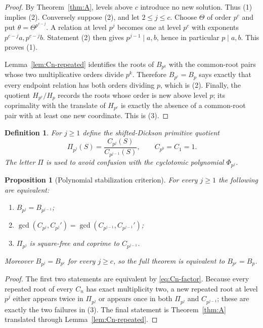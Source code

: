 \documentclass[a4paper]{article}
\newtheorem{proposition}[theorem]{Proposition}
\newtheorem{definition}[theorem]{Definition}
\begin{document}
\begin{proof}
	By Theorem~\ref{thm:A}, levels above $c$ introduce no new solution.
	Thus (1) implies (2).  Conversely suppose (2), and let
	$2\leq j\leq c$.  Choose $\Theta$ of order $p^c$ and put
	$\theta=\Theta^{p^{c-j}}$.  A relation at level $p^j$ becomes one at
	level $p^c$ with exponents $p^{c-j}a,p^{c-j}b$.  Statement (2) then
	gives $p^{j-1}\mid a,b$, hence in particular $p\mid a,b$.
	This proves (1).

	Lemma~\ref{lem:Cn-repeated} identifies the roots of $B_{p^k}$ with
	the common-root pairs whose two multiplicative orders divide $p^k$.
	Therefore $B_{p^c}=B_p$ says exactly that every endpoint relation has
	both orders dividing $p$, which is (2).  Finally, the quotient
	$H_{p^c}/H_p$ records the roots whose order is new above level $p$;
	its coprimality with the translate of $H_{p^c}$ is exactly the absence
	of a common-root pair with at least one new coordinate.  This is (3).
\end{proof}

\begin{definition}\label{def:Cn-primitive}
	For $j\geq1$ define the shifted-Dickson primitive quotient
	\[
		\Pi_{p^j}(S)=\frac{C_{p^j}(S)}{C_{p^{j-1}}(S)},
		\qquad C_{p^0}=C_1=1.
	\]
	The letter $\Pi$ is used to avoid confusion with the cyclotomic
	polynomial $\Phi_{p^j}$.
\end{definition}

\begin{proposition}[Polynomial stabilization criterion]
\label{prop:Cn-stabilization}
	For every $j\geq1$ the following are equivalent:
	\begin{enumerate}
		\item $B_{p^j}=B_{p^{j-1}}$;
		\item
		      $\gcd(C_{p^j},C_{p^j}')=
		       \gcd(C_{p^{j-1}},C_{p^{j-1}}')$;
		\item $\Pi_{p^j}$ is square-free and coprime to
		      $C_{p^{j-1}}$.
	\end{enumerate}
	Moreover $B_{p^j}=B_{p^c}$ for every $j\geq c$, so the full theorem
	is equivalent to $B_{p^c}=B_p$.
\end{proposition}

\begin{proof}
	The first two statements are equivalent by
	\eqref{eq:Cn-factor}.  Because every repeated root of every $C_n$ has
	exact multiplicity two, a new repeated root at level $p^j$ either
	appears twice in $\Pi_{p^j}$ or appears once in both
	$\Pi_{p^j}$ and $C_{p^{j-1}}$; these are exactly the two failures in
	(3).  The final statement is Theorem~\ref{thm:A} translated through
	Lemma~\ref{lem:Cn-repeated}.
\end{proof}
\end{document}
